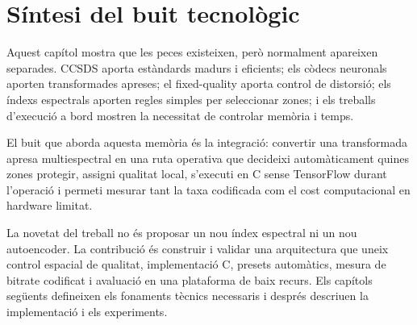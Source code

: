 \section{Síntesi del buit tecnològic}\label{sec:gap}

Aquest capítol mostra que les peces existeixen, però normalment apareixen
separades. CCSDS aporta estàndards madurs i eficients; els còdecs neuronals
aporten transformades apreses; el fixed-quality aporta control de distorsió;
els índexs espectrals aporten regles simples per seleccionar zones; i els
treballs d'execució a bord mostren la necessitat de controlar memòria i temps.

El buit que aborda aquesta memòria és la integració: convertir una transformada
apresa multiespectral en una ruta operativa que decideixi automàticament quines
zones protegir, assigni qualitat local, s'executi en C sense TensorFlow durant
l'operació i permeti mesurar tant la taxa codificada com el cost computacional
en hardware limitat.

La novetat del treball no és proposar un nou índex espectral ni un nou
autoencoder. La contribució és construir i validar una arquitectura que uneix
control espacial de qualitat, implementació C, presets automàtics, mesura de
bitrate codificat i avaluació en una plataforma de baix recurs. Els capítols
següents defineixen els fonaments tècnics necessaris i després descriuen la
implementació i els experiments.
